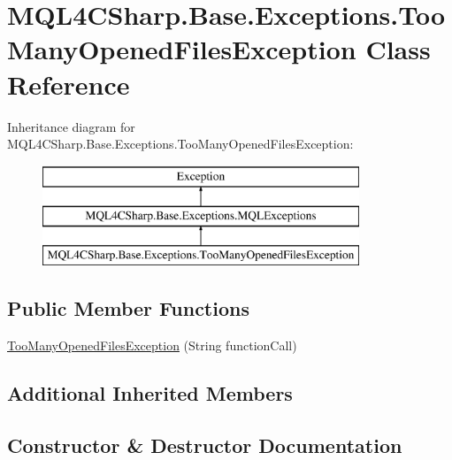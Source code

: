 \hypertarget{class_m_q_l4_c_sharp_1_1_base_1_1_exceptions_1_1_too_many_opened_files_exception}{}\section{M\+Q\+L4\+C\+Sharp.\+Base.\+Exceptions.\+Too\+Many\+Opened\+Files\+Exception Class Reference}
\label{class_m_q_l4_c_sharp_1_1_base_1_1_exceptions_1_1_too_many_opened_files_exception}
Inheritance diagram for M\+Q\+L4\+C\+Sharp.\+Base.\+Exceptions.\+Too\+Many\+Opened\+Files\+Exception\+:\begin{figure}[H]
\begin{center}
\leavevmode
\includegraphics[height=3.000000cm]{class_m_q_l4_c_sharp_1_1_base_1_1_exceptions_1_1_too_many_opened_files_exception}
\end{center}
\end{figure}
\subsection*{Public Member Functions}
\begin{DoxyCompactItemize}
\item 
\hyperlink{class_m_q_l4_c_sharp_1_1_base_1_1_exceptions_1_1_too_many_opened_files_exception_aa315932f0822fe567b2e86ce767e4188}{Too\+Many\+Opened\+Files\+Exception} (String function\+Call)
\end{DoxyCompactItemize}
\subsection*{Additional Inherited Members}


\subsection{Constructor \& Destructor Documentation}

